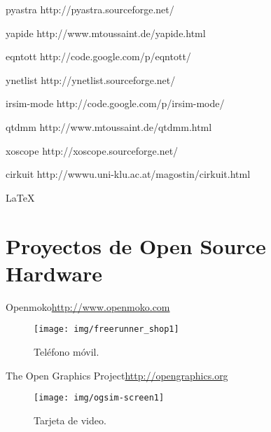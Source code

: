 \message{ !name(alternativa.tex)}\documentclass{beamer}
\begin{document}


pyastra http://pyastra.sourceforge.net/

yapide http://www.mtoussaint.de/yapide.html



eqntott http://code.google.com/p/eqntott/

ynetlist http://ynetlist.sourceforge.net/


irsim-mode http://code.google.com/p/irsim-mode/

qtdmm http://www.mtoussaint.de/qtdmm.html

xoscope http://xoscope.sourceforge.net/


cirkuit http://wwwu.uni-klu.ac.at/magostin/cirkuit.html

LaTeX 
\section{Proyectos de Open Source Hardware}



\begin{frame}{Openmoko}{\url{http://www.openmoko.com}}
  \begin{figure}
    \texttt{[image: img/freerunner\_shop1]}
    \caption{Teléfono móvil.}
    \label{fig:openmoko}
  \end{figure}
\end{frame}

\begin{frame}{The Open Graphics Project}{\url{http://opengraphics.org}}
  \begin{figure}
    \texttt{[image: img/ogsim-screen1]}
    \caption{Tarjeta de video.}
    \label{fig:ogp}
  \end{figure}
\end{frame}
\end{document}
